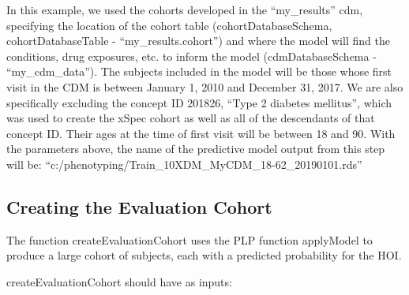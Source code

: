 \documentclass[]{article}
\begin{document}
In this example, we used the cohorts developed in the ``my\_results''
cdm, specifying the location of the cohort table (cohortDatabaseSchema,
cohortDatabaseTable - ``my\_results.cohort'') and where the model will
find the conditions, drug exposures, etc. to inform the model
(cdmDatabaseSchema - ``my\_cdm\_data''). The subjects included in the
model will be those whose first visit in the CDM is between January 1,
2010 and December 31, 2017. We are also specifically excluding the
concept ID 201826, ``Type 2 diabetes mellitus'', which was used to
create the xSpec cohort as well as all of the descendants of that
concept ID. Their ages at the time of first visit will be between 18 and
90. With the parameters above, the name of the predictive model output
from this step will be:
``c:/phenotyping/Train\_10XDM\_MyCDM\_18-62\_20190101.rds''

\hypertarget{creating-the-evaluation-cohort}{%
\subsection{Creating the Evaluation
Cohort}\label{creating-the-evaluation-cohort}}

The function createEvaluationCohort uses the PLP function applyModel to
produce a large cohort of subjects, each with a predicted probability
for the HOI.

createEvaluationCohort should have as inputs:
\end{document}
